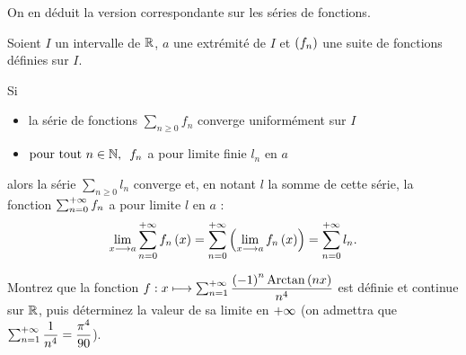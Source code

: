 On en déduit la version correspondante sur les séries de fonctions.

\begin{cor}
Soient \(I\) un intervalle de \(\mathbb{R}\), \(a\) une extrémité de \(I\) et \(\left(f_n\right)\) une suite de fonctions définies sur \(I\).

Si

\begin{itemize}
    \item la série de fonctions \(\sum_{n\geq0}f_n\) converge uniformément sur \(I\) \\
    \item \(\quantifs{\tpt n\in\N}f_n\) a pour limite finie \(l_n\) en \(a\)
\end{itemize}

alors la série \(\sum_{n\geq0}l_n\) converge et, en notant \(l\) la somme de cette série, la fonction \(\sum_{n=0}^{+\infty}f_n\) a pour limite \(l\) en \(a\) : \[\lim_{x\longrightarrow a}\sum_{n=0}^{+\infty}f_n\left(x\right)=\sum_{n=0}^{+\infty}\left(\lim_{x\longrightarrow a}f_n\left(x\right)\right)=\sum_{n=0}^{+\infty}l_n.\]
\end{cor}

\begin{exo}
Montrez que la fonction \(f:x\longmapsto\sum_{n=1}^{+\infty}\dfrac{\left(-1\right)^n\operatorname{Arctan}\left(nx\right)}{n^4}\) est définie et continue sur \(\mathbb{R}\), puis déterminez la valeur de sa limite en \(+\infty\) (on admettra que \(\sum_{n=1}^{+\infty}\dfrac{1}{n^4}=\dfrac{\pi^4}{90}\)).
\end{exo}

